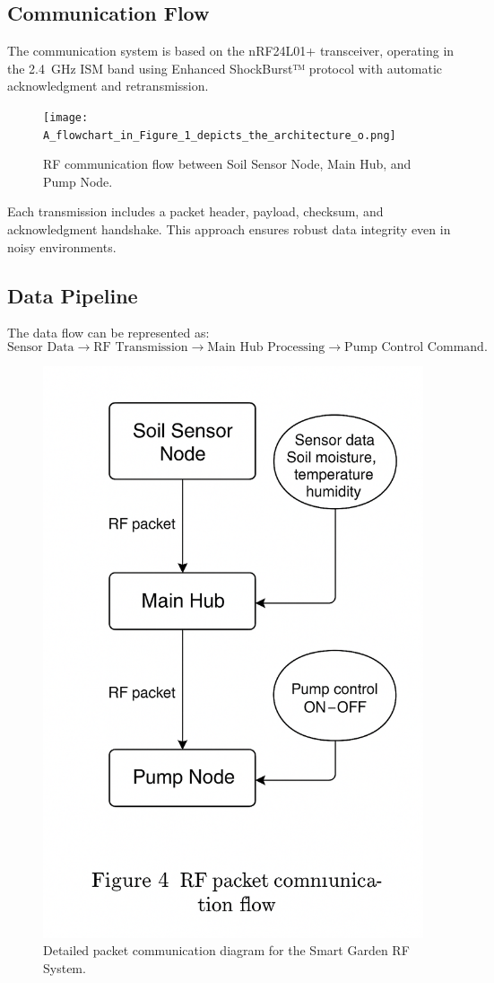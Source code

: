 \documentclass[12pt,a4paper]{article}
\begin{document}
\subsection{Communication Flow}
The communication system is based on the nRF24L01+ transceiver, operating in the 2.4~GHz ISM band using Enhanced ShockBurst™ protocol with automatic acknowledgment and retransmission.

\begin{figure}[H]\centering
\texttt{[image: A\_flowchart\_in\_Figure\_1\_depicts\_the\_architecture\_o.png]}
\caption{RF communication flow between Soil Sensor Node, Main Hub, and Pump Node.}
\end{figure}

Each transmission includes a packet header, payload, checksum, and acknowledgment handshake. This approach ensures robust data integrity even in noisy environments.

\subsection{Data Pipeline}
The data flow can be represented as:
\[
\text{Sensor Data} \rightarrow \text{RF Transmission} \rightarrow \text{Main Hub Processing} \rightarrow \text{Pump Control Command}.
\]

\begin{figure}[H]\centering
\includegraphics[width=0.9\linewidth]{rf_flow.png}
\caption{Detailed packet communication diagram for the Smart Garden RF System.}
\end{figure}
\end{document}
